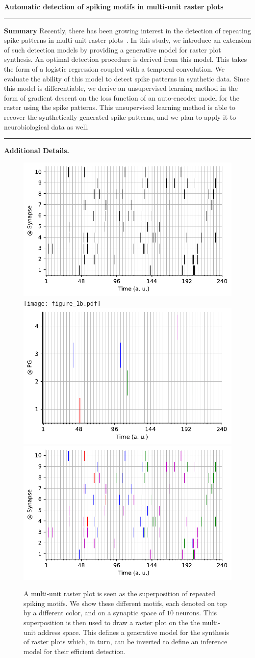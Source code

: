 \documentclass[11pt]{article}
\begin{document}
{\Large\bf 
Automatic detection of spiking motifs in multi-unit raster plots
}

\hrule
\textbf{Summary} %
Recently, there has been growing interest in the detection of repeating spike patterns in multi-unit raster plots~\parencite{russo_cell_2017, stella_3d-spade_2019}. In this study, we introduce an extension of such detection models by providing a generative model for raster plot synthesis. An optimal detection procedure is derived from this model. This takes the form of a logistic regression coupled with a temporal convolution. We evaluate the ability of this model to detect spike patterns in synthetic data. Since this model is differentiable, we derive an unsupervised learning method in the form of gradient descent on the loss function of an auto-encoder model for the raster using the spike patterns. This unsupervised learning method is able to recover the synthetically generated spike patterns, and we plan to apply it to neurobiological data as well.
\vspace{.5cm}
\hrule
\textbf{Additional Details.}%
%
\begin{figure}[h!]%
    \includegraphics[width=.245\linewidth]{figure_1a_k.pdf}
    \texttt{[image: figure\_1b.pdf]}
  \includegraphics[width=.245\linewidth]{figure_1c.pdf}
    \includegraphics[width=.245\linewidth]{figure_1a.pdf}
{
\caption{A multi-unit raster plot is seen as the superposition of repeated spiking motifs. We show these different motifs, each denoted on top by a different color, and on a synaptic space of $10$ neurons. This superposition is then used to draw a raster plot on the the multi-unit address space. This defines a generative model for the synthesis of raster plots which, in turn, can be inverted to define an inference model for their efficient detection.
}
\label{fig:1}
}
\vspace{-5pt}
\end{figure}%
\end{document}
